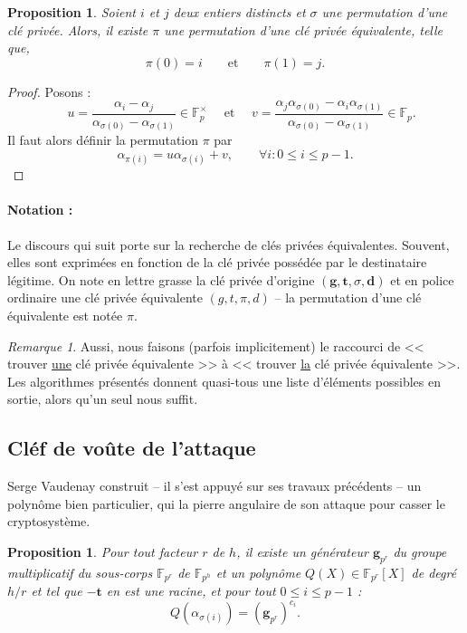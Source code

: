 \documentclass[a4paper, titlepage, 11pt]{article}
\newtheorem{prop}[theo]{Proposition}
\theoremstyle{definition}
\theoremstyle{remark}
\newtheorem{rema}[theo]{Remarque}
\def\gf #1{\mathbb{F}_{#1}}
\def\mbf #1{\mathbf{#1}}
\begin{document}
\begin{prop}\label{prop:permutation}
Soient $i$ et $j$ deux entiers distincts et $\sigma$ une permutation d'une clé privée. Alors, il existe $\pi$ une permutation d'une clé privée équivalente, telle que, $$\pi(0) = i \qquad \text{et}\qquad \pi(1) = j.$$
\end{prop}

\begin{proof}
Posons :
$$\quad u = \frac{\alpha_i - \alpha_j}{\alpha_{\sigma(0)}- \alpha_{\sigma(1)}} \in \gf{p}^\times \quad \text{ et } \quad v =  \frac{\alpha_j\alpha_{\sigma(0)} - \alpha_i\alpha_{\sigma(1)}}{\alpha_{\sigma(0)}- \alpha_{\sigma(1)}} \in \gf{p}.$$
Il faut alors définir la permutation $\pi$ par
$$\alpha_{\pi(i)} = u\alpha_{\sigma(i)} + v,\qquad \forall i : 0\leqslant i \leqslant p-1.$$
\end{proof}

\paragraph*{Notation :} Le discours qui suit porte sur la recherche de clés privées équivalentes. Souvent, elles sont exprimées en fonction de la clé privée possédée par le destinataire légitime. On note en lettre grasse la clé privée d'origine $(\mbf{g}, \mbf{t}, \sigma, \mbf{d})$ et en police ordinaire une clé privée équivalente $(g, t, \pi, d)$ -- la permutation d'une clé équivalente est notée $\pi$.

\begin{rema}
Aussi, nous faisons (parfois implicitement) le raccourci de << trouver \underline{une} clé privée équivalente >> à << trouver \underline{la} clé privée équivalente >>. Les algorithmes présentés donnent quasi-tous une liste d'éléments possibles en sortie, alors qu'un seul nous suffit.
\end{rema}

\subsection{Cléf de voûte de l'attaque}

Serge Vaudenay construit -- il s'est appuyé sur ses travaux précédents -- un polynôme bien particulier, qui la pierre angulaire de son attaque pour casser le cryptosystème.

\begin{prop}\label{prop:vaudenay}
Pour tout facteur $r$ de $h$, il existe un générateur $\mbf g_{p^r}$ du groupe multiplicatif du sous-corps $\gf{p^r}$ de $\gf{p^h}$ et un polynôme $Q(X) \in \gf{p^r}[X]$ de degré $h/r$ et tel que $-\mbf t$ en est une racine, et pour tout $0\leqslant i \leqslant p-1$ :
$$Q\left(\alpha_{\sigma(i)}\right) = (\mbf g_{p^r})^{c_i}.$$
\end{prop}
\end{document}
